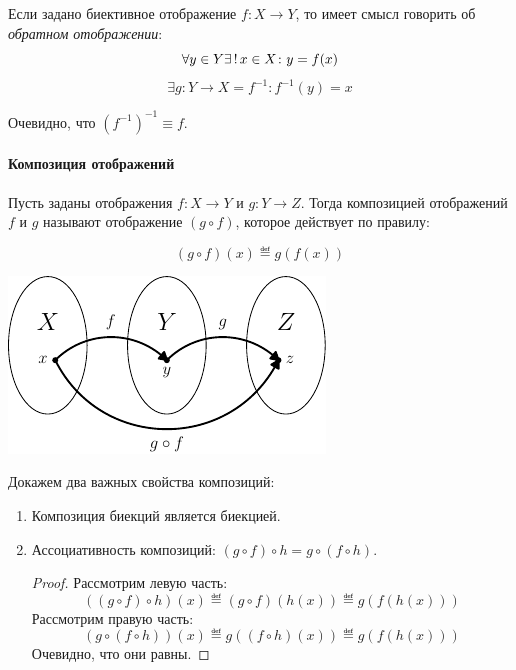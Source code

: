 Если задано биективное отображение $f\colon X\to Y$, то имеет смысл говорить об
\emph{обратном отображении}:
$$\forall y\in Y\exists\,!\, x\in X\colon y=f(x)$$
$$\exists g\colon Y\to X=f^{-1}\colon f^{-1}(y)=x$$

Очевидно, что $\left(f^{-1}\right)^{-1}\equiv f$.

\paragraph{Композиция отображений}

\begin{df}
	Пусть заданы отображения $f\colon X\to Y$ и $g\colon Y\to Z$. Тогда композицией
	отображений $f$ и $g$ называют отображение $(g\circ f)$, которое действует по правилу:

	$$(g\circ f)(x)\eqdef g(f(x))$$

	\begin{center}
		\includegraphics{graph/mapping-composition}
	\end{center}
\end{df}

Докажем два важных свойства композиций:

\begin{enumerate}
	\item Композиция биекций является биекцией.
	\item Ассоциативность композиций: $(g\circ f)\circ h=g\circ(f\circ h)$.
		\begin{proof}
			Рассмотрим левую часть:
			$$((g\circ f)\circ h)(x)\eqdef(g\circ f)(h(x))\eqdef g(f(h(x)))$$
			Рассмотрим правую часть:
			$$(g\circ(f\circ h))(x)\eqdef g((f\circ h)(x))\eqdef g(f(h(x)))$$
			Очевидно, что они равны.
		\end{proof}
\end{enumerate}

